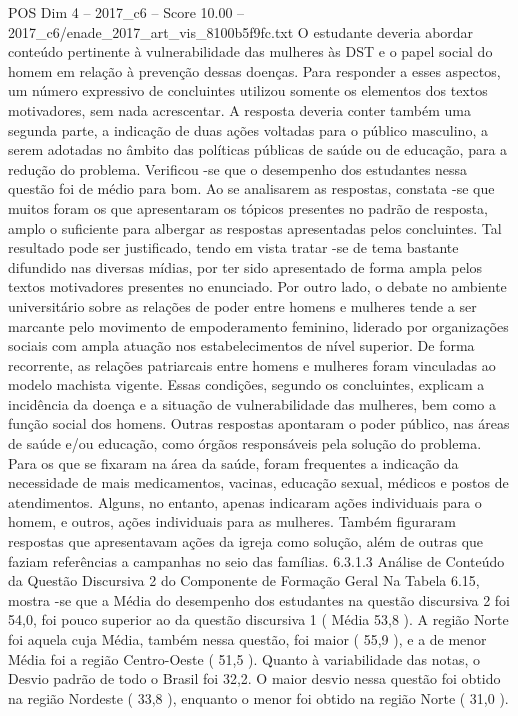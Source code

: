 \begin{textsample}{POS Dim 4 – 2017\_c6 – Score 10.00 – 2017\_c6/enade\_2017\_art\_vis\_8100b5f9fc.txt}
O estudante deveria abordar conteúdo pertinente à vulnerabilidade das mulheres às DST e o papel social do homem em relação à prevenção dessas doenças.
Para responder a esses aspectos, um número expressivo de concluintes utilizou somente os elementos dos textos motivadores, sem nada acrescentar.
A resposta deveria conter também uma segunda parte, a indicação de duas ações voltadas para o público masculino, a serem adotadas no âmbito das políticas públicas de saúde ou de educação, para a redução do problema.
Verificou -se que o desempenho dos estudantes nessa questão foi de médio para bom.
Ao se analisarem as respostas, constata -se que muitos foram os que apresentaram os tópicos presentes no padrão de resposta, amplo o suficiente para albergar as respostas apresentadas pelos concluintes.
Tal resultado pode ser justificado, tendo em vista tratar -se de tema bastante difundido nas diversas mídias, por ter sido apresentado de forma ampla pelos textos motivadores presentes no enunciado.
Por outro lado, o debate no ambiente universitário sobre as relações de poder entre homens e mulheres tende a ser marcante pelo movimento de empoderamento feminino, liderado por organizações sociais com ampla atuação nos estabelecimentos de nível superior.
De forma recorrente, as relações patriarcais entre homens e mulheres foram vinculadas ao modelo machista vigente.
Essas condições, segundo os concluintes, explicam a incidência da doença e a situação de vulnerabilidade das mulheres, bem como a função social dos homens.
Outras respostas apontaram o poder público, nas áreas de saúde e/ou educação, como órgãos responsáveis pela solução do problema.
Para os que se fixaram na área da saúde, foram frequentes a indicação da necessidade de mais medicamentos, vacinas, educação sexual, médicos e postos de atendimentos.
Alguns, no entanto, apenas indicaram ações individuais para o homem, e outros, ações individuais para as mulheres.
Também figuraram respostas que apresentavam ações da igreja como solução, além de outras que faziam referências a campanhas no seio das famílias. 6.3.1.3 Análise de Conteúdo da Questão Discursiva 2 do Componente de Formação Geral Na Tabela 6.15, mostra -se que a Média do desempenho dos estudantes na questão discursiva 2 foi 54,0, foi pouco superior ao da questão discursiva 1 ( Média 53,8 ).
A região Norte foi aquela cuja Média, também nessa questão, foi maior ( 55,9 ), e a de menor Média foi a região Centro-Oeste ( 51,5 ).
Quanto à variabilidade das notas, o Desvio padrão de todo o Brasil foi 32,2.
O maior desvio nessa questão foi obtido na região Nordeste ( 33,8 ), enquanto o menor foi obtido na região Norte ( 31,0 ).

\end{textsample}
